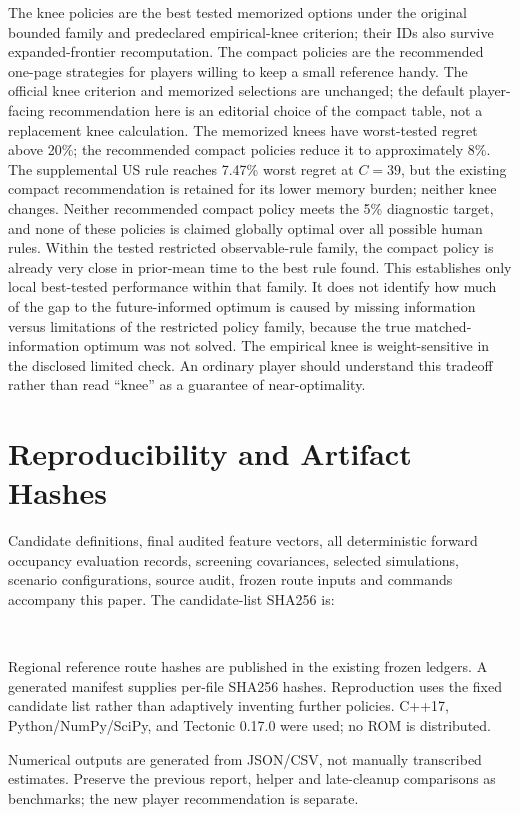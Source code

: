 \documentclass[11pt]{article}
\theoremstyle{definition}\newtheorem{definition}[theorem]{Definition}
\begin{document}
\begin{samepage}
The knee policies are the best tested memorized options under the original bounded family and predeclared empirical-knee criterion; their IDs also survive expanded-frontier recomputation. The compact policies are the recommended one-page strategies for players willing to keep a small reference handy. The official knee criterion and memorized selections are unchanged; the default player-facing recommendation here is an editorial choice of the compact table, not a replacement knee calculation. The memorized knees have worst-tested regret above 20\%; the recommended compact policies reduce it to approximately 8\%. The supplemental US rule reaches 7.47\% worst regret at $C=39$, but the existing compact recommendation is retained for its lower memory burden; neither knee changes. Neither recommended compact policy meets the 5\% diagnostic target, and none of these policies is claimed globally optimal over all possible human rules. Within the tested restricted observable-rule family, the compact policy is already very close in prior-mean time to the best rule found. This establishes only local best-tested performance within that family. It does not identify how much of the gap to the future-informed optimum is caused by missing information versus limitations of the restricted policy family, because the true matched-information optimum was not solved. The empirical knee is weight-sensitive in the disclosed limited check. An ordinary player should understand this tradeoff rather than read ``knee'' as a guarantee of near-optimality.

\end{samepage}
\appendix
\section{Reproducibility and Artifact Hashes}
Candidate definitions, final audited feature vectors, all deterministic forward occupancy evaluation records, screening covariances, selected simulations, scenario configurations, source audit, frozen route inputs and commands accompany this paper. The candidate-list SHA256 is:\par{}\\\par Regional reference route hashes are published in the existing frozen ledgers. A generated manifest supplies per-file SHA256 hashes. Reproduction uses the fixed candidate list rather than adaptively inventing further policies. C++17, Python/NumPy/SciPy, and Tectonic 0.17.0 were used; no ROM is distributed.\par
Numerical outputs are generated from JSON/CSV, not manually transcribed estimates. Preserve the previous report, helper and late-cleanup comparisons as benchmarks; the new player recommendation is separate.
\end{document}
